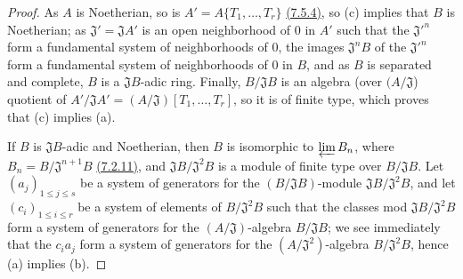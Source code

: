 \begin{proof}
\label{proof-0.7.5.5}
As $A$ is Noetherian, so is $A'=A\{T_1,\dots,T_r\}$ \hyperref[0.7.5.4]{(7.5.4)}, so
(c) implies that $B$ is Noetherian; as $\mathfrak{J}'=\mathfrak{J}A'$ is an open neighborhood
of $0$ in $A'$ such that the ${\mathfrak{J}'}^n$ form a fundamental system of neighborhoods of
$0$, the images $\mathfrak{J}^n B$ of the ${\mathfrak{J}'}^n$ form a fundamental system of
neighborhoods of $0$ in $B$, and as $B$ is separated and complete, $B$ is a $\mathfrak{J}B$-adic
ring. Finally, $B/\mathfrak{J}B$ is an algebra (over $(A/\mathfrak{J}$) quotient of
$A'/\mathfrak{J}A'=(A/\mathfrak{J})[T_1,\dots,T_r]$, so it is of finite type, which proves that
(c) implies (a).

If $B$ is $\mathfrak{J}B$-adic and Noetherian, then $B$ is isomorphic to $\varprojlim B_n$, where
$B_n=B/\mathfrak{J}^{n+1}B$ \hyperref[0.7.2.11]{(7.2.11)}, and $\mathfrak{J}B/\mathfrak{J}^2 B$
is a module of finite type over $B/\mathfrak{J}B$. Let $(a_j)_{1\leqslant j\leqslant s}$ be a
system of generators for the $(B/\mathfrak{J}B)$-module $\mathfrak{J}B/\mathfrak{J}^2 B$, and let
$(c_i)_{1\leqslant i\leqslant r}$ be a system of elements of $B/\mathfrak{J}^2 B$ such that the
classes
mod $\mathfrak{J}B/\mathfrak{J}^2 B$ form a system of generators for the $(A/\mathfrak{J})$-algebra
$B/\mathfrak{J}B$; we see immediately that the $c_i a_j$ form a system of generators for the
$(A/\mathfrak{J}^2)$-algebra $B/\mathfrak{J}^2 B$, hence (a) implies (b).


\end{proof}
